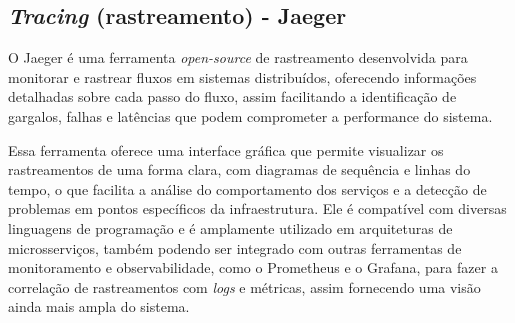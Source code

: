 \subsection{\emph{Tracing} (rastreamento) - Jaeger}
O Jaeger é uma ferramenta \emph{open-source} de rastreamento desenvolvida para monitorar e rastrear fluxos em sistemas distribuídos, oferecendo informações detalhadas sobre cada passo do fluxo, assim facilitando a identificação de gargalos, falhas e latências que podem comprometer a performance do sistema. \cite{jaeger}

Essa ferramenta oferece uma interface gráfica que permite visualizar os rastreamentos de uma forma clara, com diagramas de sequência e linhas do tempo, o que facilita a análise do comportamento dos serviços e a detecção de problemas em pontos específicos da infraestrutura. Ele é compatível com diversas linguagens de programação e é amplamente utilizado em arquiteturas de microsserviços, também podendo ser integrado com outras ferramentas de monitoramento e observabilidade, como o Prometheus e o Grafana, para fazer a correlação de rastreamentos com \emph{logs} e métricas, assim fornecendo uma visão ainda mais ampla do sistema. \cite{jaeger}
  






